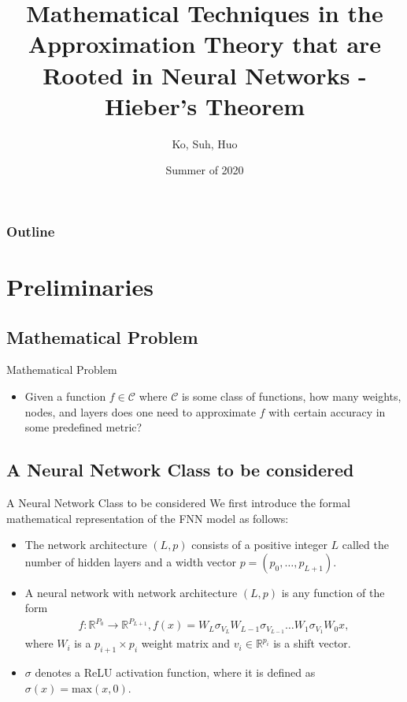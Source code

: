 \documentclass{if-beamer}
\title[Neural Networks in Approximation]{Mathematical Techniques in the Approximation Theory that are Rooted in Neural Networks - Hieber's Theorem}
\author{Ko, Suh, Huo}
\institute{Georgia Tech}
\date{Summer of 2020}
\begin{document}
\begin{frame}
  \titlepage
\end{frame}

\begin{frame}
    \frametitle{Outline}
    \begin{multicols}{2}
        \tableofcontents
    \end{multicols}
\end{frame}

\section{Preliminaries}
\subsection{Mathematical Problem}
\begin{frame}{Mathematical Problem}
\begin{itemize}
    \item Given a function $f \in \mathcal{C}$ where $\mathcal{C}$ is some class of functions, how many weights, nodes, and layers does one need to approximate $f$ with certain accuracy in some predefined metric?
\end{itemize}
\end{frame}

\subsection{A Neural Network Class to be considered}
\begin{frame}{A Neural Network Class to be considered}
    We first introduce the formal mathematical representation of the FNN model as follows: 
    \begin{itemize}
        \item The network architecture $(L,p)$ consists of a positive integer $L$ called the number of hidden layers and a width vector $p=(p_0,\dots,p_{L+1})$. 
        
        \item A neural network with network architecture $(L,p)$ is any function of the form
        \begin{eqnarray} \label{eq:eq1}
            f:\mathbb{R}^{P_0}\rightarrow{\mathbb{R}^{P_{L+1}}}, f(x)=W_L\sigma_{V_{L}}W_{L-1}\sigma_{V_{L-1}}\dots W_1\sigma_{V_{1}}W_0x,
        \end{eqnarray}
        where $W_i$ is a $p_{i+1}\times p_{i}$ weight matrix and $v_i \in \mathbb{R}^{p_i}$ is a shift vector. 
        
        \item $\sigma$ denotes a ReLU activation function, where it is defined as $\sigma(x)=\mbox{max}(x,0)$. 
    \end{itemize}
\end{frame}
\end{document}
